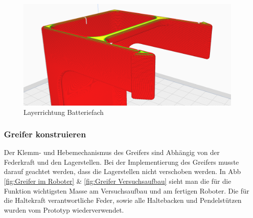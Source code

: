 \begin{figure}[H]
\centering
\includegraphics[width=\textwidth]{assets/MT/Layer_Batterie Fach.png}
\caption{Layerrichtung Batteriefach}
\label{Layerrichtung Batteriefach}
\end{figure}

\subsubsection{Greifer konstruieren}
\label{Greifer konstruieren}

Der Klemm- und Hebemechanismus des Greifers sind Abhängig von der Federkraft und den Lagerstellen. Bei der Implementierung des Greifers musste darauf geachtet werden, dass die Lagerstellen nicht verschoben werden. In Abb \ref{fig:Greifer im Roboter} \& \ref{fig:Greifer Versuchsaufbau} sieht man die für die Funktion wichtigsten Masse am Versuchsaufbau und am fertigen Roboter. Die für die Haltekraft verantwortliche Feder, sowie alle Haltebacken und Pendelstützen wurden vom Prototyp wiederverwendet. 

